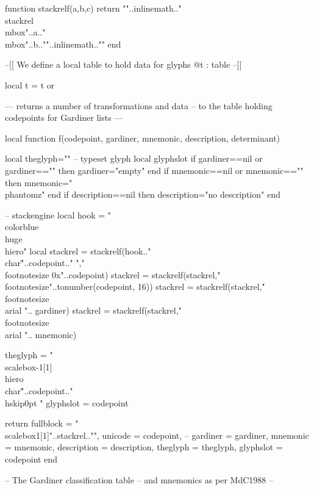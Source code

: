 function stackrelf(a,b,c)
  return ""..inlinemath.."\\stackrel{\\mbox{"..a.."}}{\\mbox{"..b.."}}"..inlinemath..""
end

--[[
We define a local table to hold data for glyphs
@t : table
--]]

local t = t or {}

--- returns a number of transformations and data
-- to the table holding codepoints for Gardiner lists
---

local function f(codepoint, gardiner, mnemonic,
                 description, determinant)

     local theglyph=""  -- typeset glyph
     local glyphslot
  if gardiner==nil or gardiner=="" then gardiner="empty" end
     if mnemonic==nil or mnemonic=="" then mnemonic="\\phantom{z}" end
     if description==nil then description="no description" end

-- stackengine
   local hook = "\\color{blue}\\huge\\hiero"
   local stackrel = stackrelf(hook.."\\char\""..codepoint.." ","\\footnotesize 0x"..codepoint)
   stackrel = stackrelf(stackrel,"\\footnotesize"..tonumber(codepoint, 16))
   stackrel = stackrelf(stackrel,"\\footnotesize \\arial ".. gardiner)
   stackrel = stackrelf(stackrel,"\\footnotesize \\arial ".. mnemonic)

   theglyph = "\\scalebox{-1}[1]{\\hiero\\char\""..codepoint.."\\hskip0pt }"
   glyphslot = codepoint

return {  fullblock     = "\\scalebox{1}[1]{"..stackrel.."}",
          unicode       = codepoint, --
          gardiner      = gardiner,
          mnemonic      = mnemonic,
          description   = description,
          theglyph      = theglyph,
          glyphslot     = codepoint}
end

-- The Gardiner classification table
-- and mnemonics as per MdC1988
--


